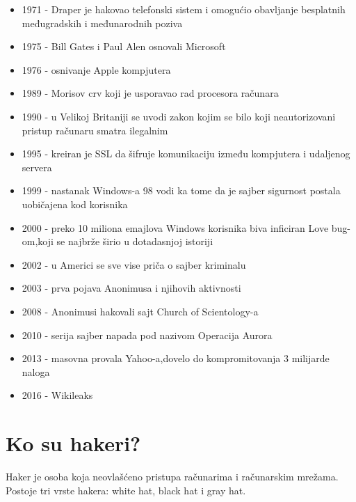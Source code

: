 \documentclass[a4paper]{article}
\begin{document}
\begin{itemize}
\item 1971 - Draper je hakovao telefonski sistem i omogućio obavljanje besplatnih međugradskih i međunarodnih poziva
\item 1975 - Bill Gates i Paul Alen osnovali Microsoft
\item 1976 - osnivanje Apple kompjutera
\item 1989 - Morisov crv koji je usporavao rad procesora računara
\item 1990 - u Velikoj Britaniji se uvodi zakon kojim se bilo koji neautorizovani pristup računaru smatra ilegalnim
\item 1995 - kreiran je SSL da šifruje komunikaciju između kompjutera i udaljenog servera
\item 1999 - nastanak Windows-a 98 vodi ka tome da je sajber sigurnost postala uobičajena kod korisnika
\item 2000 - preko 10 miliona emajlova Windows korisnika biva inficiran Love bug-om,koji se najbrže širio u dotadasnjoj istoriji
\item 2002 - u Americi se sve vise priča o sajber kriminalu
\item 2003 - prva pojava Anonimusa i njihovih aktivnosti
\item 2008 - Anonimusi hakovali sajt Church of Scientology-a
\item 2010 - serija sajber napada pod nazivom Operacija Aurora 
\item 2013 - masovna provala Yahoo-a,dovelo do kompromitovanja 3 milijarde naloga
\item 2016 - Wikileaks

\end{itemize} 

\newpage


\section{Ko su hakeri?}	
\label{sec:naslov1}
Haker je osoba koja neovlašćeno pristupa računarima i računarskim mrežama.
\newline
Postoje tri vrste hakera: white hat, black hat i gray hat.
\newline
\newline
\newline
\end{document}
